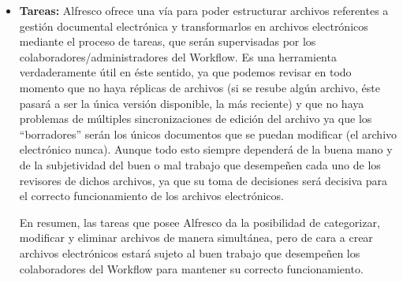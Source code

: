 \documentclass{article}
\begin{document}
\begin{itemize}
\item \textbf{Tareas:} Alfresco ofrece una vía para poder estructurar archivos referentes a gestión documental electrónica y transformarlos en archivos electrónicos mediante el proceso de tareas, que serán supervisadas por los colaboradores/administradores del Workflow. Es una herramienta verdaderamente útil en éste sentido, ya que podemos revisar en todo momento que no haya réplicas de archivos (si se resube algún archivo, éste pasará a ser la única versión disponible, la más reciente) y que no haya problemas de múltiples sincronizaciones de edición del archivo ya que los “borradores” serán los únicos documentos que se puedan modificar (el archivo electrónico nunca). Aunque todo esto siempre dependerá de la buena mano y de la subjetividad del buen o mal trabajo que desempeñen cada uno de los revisores de dichos archivos, ya que su toma de decisiones será decisiva para el correcto funcionamiento de los archivos electrónicos.
	
En resumen, las tareas que posee Alfresco da la posibilidad de categorizar, modificar y eliminar archivos de manera simultánea, pero de cara a crear archivos electrónicos estará sujeto al buen trabajo que desempeñen los colaboradores del Workflow para mantener su correcto funcionamiento.


\end{itemize}
\end{document}
